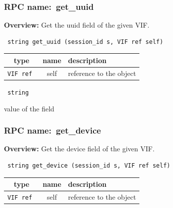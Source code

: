 \subsubsection{RPC name:~get\_uuid}

{\bf Overview:} 
Get the uuid field of the given VIF.

\begin{verbatim} string get_uuid (session_id s, VIF ref self)\end{verbatim}



 
\vspace{0.3cm}
\begin{tabular}{|c|c|p{7cm}|}
 \hline
{\bf type} & {\bf name} & {\bf description} \\ \hline
{\tt VIF ref } & self & reference to the object \\ \hline 

\end{tabular}

\vspace{0.3cm}

{\tt 
string
}


value of the field
\vspace{0.3cm}
\vspace{0.3cm}
\vspace{0.3cm}
\subsubsection{RPC name:~get\_device}

{\bf Overview:} 
Get the device field of the given VIF.

\begin{verbatim} string get_device (session_id s, VIF ref self)\end{verbatim}



 
\vspace{0.3cm}
\begin{tabular}{|c|c|p{7cm}|}
 \hline
{\bf type} & {\bf name} & {\bf description} \\ \hline
{\tt VIF ref } & self & reference to the object \\ \hline 

\end{tabular}

\vspace{0.3cm}

